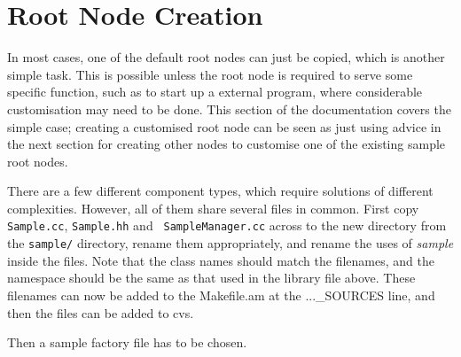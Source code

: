 \documentclass[pdftex,a4paper]{article}
\begin{document}
\section{Root Node Creation}

In most cases, one of the default root nodes can just be copied, which
is another simple task. This is possible unless the root node is
required to serve some specific function, such as to start up a
external program, where considerable customisation may need to be
done. This section of the documentation covers the simple case;
creating a customised root node can be seen as just using advice in
the next section for creating other nodes to customise one of the
existing sample root nodes.

There are a few different component types, which require solutions of
different complexities. However, all of them share several files in
common. First copy {\tt Sample.cc}, {\tt Sample.hh} and {\tt
SampleManager.cc} across to the new directory from the {\tt sample/}
directory, rename them appropriately, and rename the uses of {\em
sample} inside the files. Note that the class names should match the
filenames, and the namespace should be the same as that used in the
library file above. These filenames can now be added to the
Makefile.am at the ...\_SOURCES line, and then the files can be added
to cvs.

Then a sample factory file has to be chosen.
\end{document}

